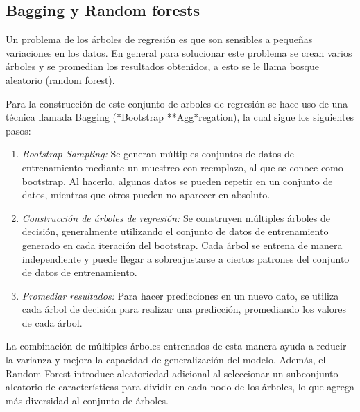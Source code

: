\documentclass[
]{book}
\begin{document}
\subsection{Bagging y Random forests}\label{bagging-y-random-forests-1}

Un problema de los árboles de regresión es que son sensibles a pequeñas
variaciones en los datos. En general para solucionar este problema se
crean varios árboles y se promedian los resultados obtenidos, a esto se
le llama bosque aleatorio (random forest).

Para la construcción de este conjunto de arboles de regresión se hace
uso de una técnica llamada Bagging (*Bootstrap **Agg*regation), la
cual sigue los siguientes pasos:

\begin{enumerate}
\def\labelenumi{\arabic{enumi}.}
\item
  \emph{Bootstrap Sampling:} Se generan múltiples conjuntos de datos de
  entrenamiento mediante un muestreo con reemplazo, al que se conoce
  como bootstrap. Al hacerlo, algunos datos se pueden repetir en un
  conjunto de datos, mientras que otros pueden no aparecer en
  absoluto.
\item
  \emph{Construcción de árboles de regresión:} Se construyen múltiples
  árboles de decisión, generalmente utilizando el conjunto de datos de
  entrenamiento generado en cada iteración del bootstrap. Cada árbol
  se entrena de manera independiente y puede llegar a sobreajustarse a
  ciertos patrones del conjunto de datos de entrenamiento.
\item
  \emph{Promediar resultados:} Para hacer predicciones en un nuevo dato, se
  utiliza cada árbol de decisión para realizar una predicción,
  promediando los valores de cada árbol.
\end{enumerate}

La combinación de múltiples árboles entrenados de esta manera ayuda a
reducir la varianza y mejora la capacidad de generalización del modelo.
Además, el Random Forest introduce aleatoriedad adicional al seleccionar
un subconjunto aleatorio de características para dividir en cada nodo de
los árboles, lo que agrega más diversidad al conjunto de árboles.
\end{document}
